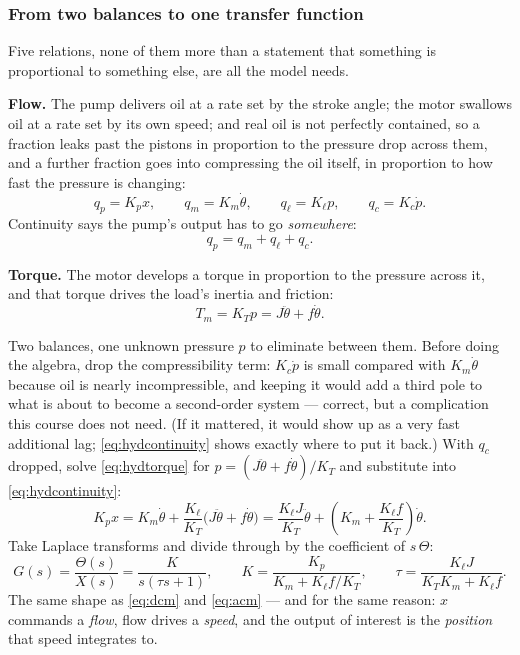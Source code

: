 \documentclass[11pt,a4paper]{article}
\begin{document}
\subsubsection{From two balances to one transfer function}
\label{sss:swashplate}

Five relations, none of them more than a statement that something is
proportional to something else, are all the model needs.

\textbf{Flow.} The pump delivers oil at a rate set by the stroke angle; the
motor swallows oil at a rate set by its own speed; and real oil is not
perfectly contained, so a fraction leaks past the pistons in proportion to the
pressure drop across them, and a further fraction goes into compressing the
oil itself, in proportion to how fast the pressure is changing:
\[
  q_{p}=K_{p}x, \qquad q_{m}=K_{m}\dot\theta, \qquad
  q_{\ell}=K_{\ell}p, \qquad q_{c}=K_{c}\dot p .
\]
Continuity says the pump's output has to go \emph{somewhere}:
\begin{equation}
  q_{p}=q_{m}+q_{\ell}+q_{c}.
  \label{eq:hydcontinuity}
\end{equation}

\textbf{Torque.} The motor develops a torque in proportion to the pressure
across it, and that torque drives the load's inertia and friction:
\begin{equation}
  T_{m}=K_{T}p=J\ddot\theta+f\dot\theta .
  \label{eq:hydtorque}
\end{equation}

Two balances, one unknown pressure $p$ to eliminate between them. Before doing
the algebra, drop the compressibility term: $K_{c}\dot p$ is small compared
with $K_{m}\dot\theta$ because oil is nearly incompressible, and keeping it
would add a third pole to what is about to become a second-order system ---
correct, but a complication this course does not need. (If it mattered, it
would show up as a very fast additional lag; \eqref{eq:hydcontinuity} shows
exactly where to put it back.) With $q_{c}$ dropped, solve
\eqref{eq:hydtorque} for $p=(J\ddot\theta+f\dot\theta)/K_{T}$ and substitute
into \eqref{eq:hydcontinuity}:
\[
  K_{p}x = K_{m}\dot\theta + \frac{K_{\ell}}{K_{T}}\bigl(J\ddot\theta+f\dot\theta\bigr)
  = \frac{K_{\ell}J}{K_{T}}\ddot\theta + \left(K_{m}+\frac{K_{\ell}f}{K_{T}}\right)\dot\theta .
\]
Take Laplace transforms and divide through by the coefficient of $s\,\Theta$:
\begin{equation}
  G(s)=\frac{\Theta(s)}{X(s)}=\frac{K}{s(\tau s+1)},
  \qquad
  K=\frac{K_{p}}{K_{m}+K_{\ell}f/K_{T}},
  \qquad
  \tau=\frac{K_{\ell}J}{K_{T}K_{m}+K_{\ell}f} .
  \label{eq:hyd}
\end{equation}
The same shape as \eqref{eq:dcm} and \eqref{eq:acm} --- and for the same
reason: $x$ commands a \emph{flow}, flow drives a \emph{speed}, and the
output of interest is the \emph{position} that speed integrates to.
\end{document}
